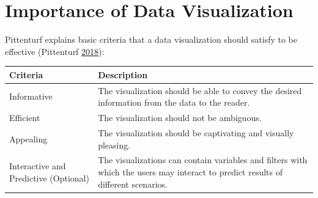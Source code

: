 \documentclass[]{book}
\begin{document}
\hypertarget{importance-of-data-visualization}{%
\section{Importance of Data Visualization}\label{importance-of-data-visualization}}

Pittenturf explains basic criteria that a data visualization should satisfy to be effective (Pittenturf \protect\hyperlink{ref-viz_importance}{2018}):

\begin{longtable}[]{@{}ll@{}}
\toprule
\begin{minipage}[b]{0.15\columnwidth}\raggedright
\textbf{Criteria}\strut
\end{minipage} & \begin{minipage}[b]{0.79\columnwidth}\raggedright
\textbf{Description}\strut
\end{minipage}\tabularnewline
\midrule
\endhead
\begin{minipage}[t]{0.15\columnwidth}\raggedright
Informative\strut
\end{minipage} & \begin{minipage}[t]{0.79\columnwidth}\raggedright
The visualization should be able to convey the desired information from the data to the reader.\strut
\end{minipage}\tabularnewline
\begin{minipage}[t]{0.15\columnwidth}\raggedright
Efficient\strut
\end{minipage} & \begin{minipage}[t]{0.79\columnwidth}\raggedright
The visualization should not be ambiguous.\strut
\end{minipage}\tabularnewline
\begin{minipage}[t]{0.15\columnwidth}\raggedright
Appealing\strut
\end{minipage} & \begin{minipage}[t]{0.79\columnwidth}\raggedright
The visualization should be captivating and visually pleasing.\strut
\end{minipage}\tabularnewline
\begin{minipage}[t]{0.15\columnwidth}\raggedright
Interactive and Predictive (Optional)\strut
\end{minipage} & \begin{minipage}[t]{0.79\columnwidth}\raggedright
The visualizations can contain variables and filters with which the users may interact to predict results of different scenarios.\strut
\end{minipage}\tabularnewline
\bottomrule
\end{longtable}
\end{document}
